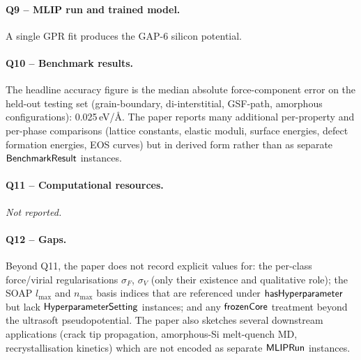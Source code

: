\paragraph{Q9 -- MLIP run and trained model.}
A single GPR fit produces the GAP-6 silicon potential.


\paragraph{Q10 -- Benchmark results.}
The headline accuracy figure is the median absolute force-component
error on the held-out testing set (grain-boundary, di-interstitial,
GSF-path, amorphous configurations): 0.025\,eV/\AA. The paper
reports many additional per-property and per-phase comparisons (lattice
constants, elastic moduli, surface energies, defect formation
energies, EOS curves) but in derived form rather than as separate
$\mathsf{BenchmarkResult}$ instances.


\paragraph{Q11 -- Computational resources.}
\emph{Not reported.}


\paragraph{Q12 -- Gaps.}
Beyond Q11, the paper does not record explicit values for: the
per-class force/virial regularisations $\sigma_F$, $\sigma_V$ (only
their existence and qualitative role); the SOAP $l_{\max}$ and
$n_{\max}$ basis indices that are referenced under
$\mathsf{hasHyperparameter}$ but lack
$\mathsf{HyperparameterSetting}$ instances; and any $\mathsf{frozenCore}$
treatment beyond the ultrasoft pseudopotential. The paper also
sketches several downstream applications (crack tip propagation,
amorphous-Si melt-quench MD, recrystallisation kinetics) which are
not encoded as separate $\mathsf{MLIPRun}$ instances.
